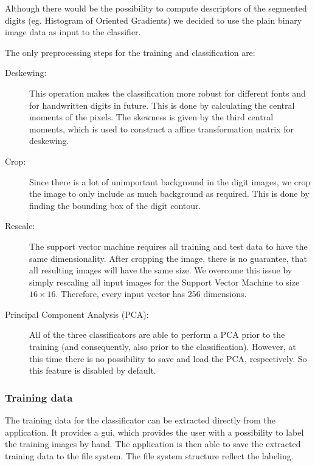 \documentclass[
a4paper,     %
12pt         %
]{scrartcl}  %
\begin{document}
Although there would be the possibility to compute descriptors of the segmented digits
(eg. Histogram of Oriented Gradients) we decided to use the plain binary image data
as input to the classifier.

The only preprocessing steps for the training and classification are:

\begin{description}
  \item[Deskewing:] This operation makes the classification more robust for different
  fonts and for handwritten digits in future. This is done by calculating the central
  moments of the pixels. The skewness is given by the third central moments, which is
  used to construct a affine transformation matrix for deskewing.
  \item[Crop:] Since there is a lot of unimportant background in the digit images, we
  crop the image to only include as much background as required. This is done by finding
  the bounding box of the digit contour.
  \item[Rescale:] The support vector machine requires all training and test data to have
  the same dimensionality. After cropping the image, there is no guarantee, that all resulting
  images will have the same size. We overcome this issue by simply rescaling all input
  images for the Support Vector Machine to size $16 \times 16$. Therefore, every input
  vector has 256 dimensions.
  \item[Principal Component Analysis (PCA):] All of the three classificators are able to
  perform a PCA prior to the training (and consequently, also prior to the classification).
  However, at this time there is no possibility to save and load the PCA, respectively.
  So this feature is disabled by default. 
\end{description}

\subsubsection{Training data}

The training data for the classificator can be extracted directly from the application. It
provides a gui, which provides the user with a possibility to label the training images
by hand. The application is then able to save the extracted training data to the file system.
The file system structure reflect the labeling.
\end{document}
